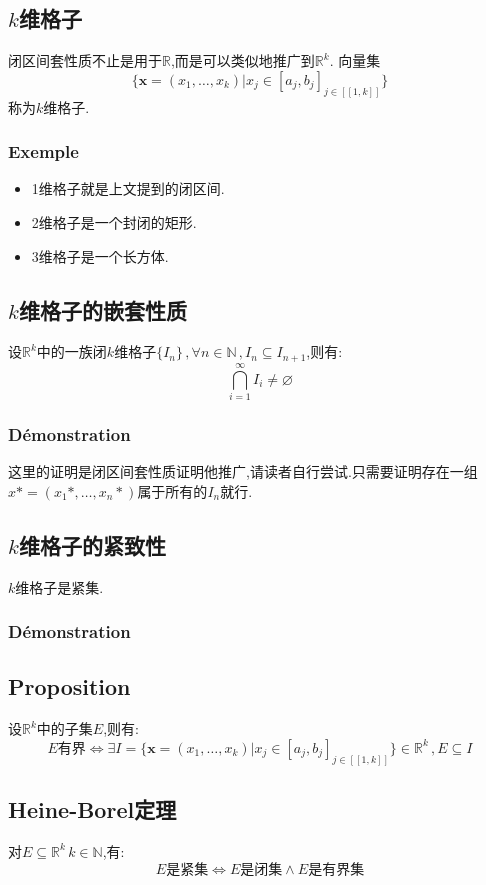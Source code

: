 \documentclass[12pt, a4paper, oneside]{ctexbook}
\newcommand{\R }{\mathbb{R}}%
\begin{document}
  \subsection{$k$维格子}
  闭区间套性质不止是用于$\R$,而是可以类似地推广到$\R^k$.
  向量集
  $$\{\textbf{x}=(x_1,\dots,x_k)|x_j\in[a_j,b_j]_{j\in[\![1,k]\!]} \} $$
  称为$k$维格子.
  \subsubsection{Exemple}
  \begin{itemize}
    \item 1维格子就是上文提到的闭区间.
    \item 2维格子是一个封闭的矩形.
    \item 3维格子是一个长方体.
  \end{itemize}
  \subsection{$k$维格子的嵌套性质}
  设$\R^k$中的一族闭$k$维格子$\{I_n \}\,, \forall n\in \mathbb{N}\,,I_n\subseteq I_{n+1}$,则有:
  $$
    \bigcap_{i=1}^\infty I_i\neq \varnothing
  $$
  \subsubsection{Démonstration}
  这里的证明是闭区间套性质证明他推广,请读者自行尝试.只需要证明存在一组$x*=(x_1*,\dots,x_n*)$属于所有的$I_n$就行.

  \subsection{$k$维格子的紧致性}
  $k$维格子是紧集.
  \subsubsection{Démonstration}

  \subsection{Proposition}
  设$\R^k$中的子集$E$,则有:
  $$
  E\text{有界}\Leftrightarrow\exists I=\{\textbf{x}=(x_1,\dots,x_k)|x_j\in[a_j,b_j]_{j\in[\![1,k]\!]} \}\in \R^k\,, E\subseteq I
  $$
  \subsection{Heine-Borel定理}
  对$E\subseteq \R^k\, k\in \mathbb{N}$,有:
  $$
  E\text{是紧集}\Leftrightarrow E\text{是闭集}\land E\text{是有界集}
  $$
\end{document}
